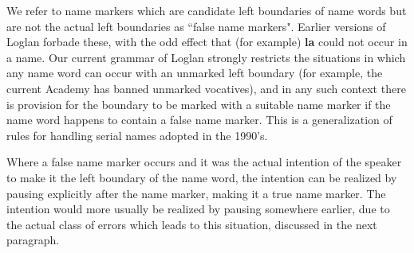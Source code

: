\documentclass[12pt]{book}
\begin{document}
We refer to name markers which are candidate left boundaries of name words but are not the actual left boundaries as ``false name markers".  Earlier versions of Loglan forbade these, with the odd effect that (for example) {\bf la} could not occur in a name.  Our current grammar of Loglan strongly restricts the situations in which any name word can occur with an unmarked left boundary (for example, the current Academy has banned unmarked vocatives), and in any such context there is provision for the boundary to be marked with a suitable name marker if the name word happens to contain a false name marker.  This is a generalization of rules for handling serial names adopted in the 1990's.

Where a false name marker occurs and it was the actual intention of the speaker to make it the left boundary of the name word, the intention can be realized by pausing explicitly after the name marker, making it a true name marker.  The intention would more usually be realized by pausing somewhere earlier, due to the actual class of errors which leads to this situation, discussed in the next paragraph.
\end{document}
